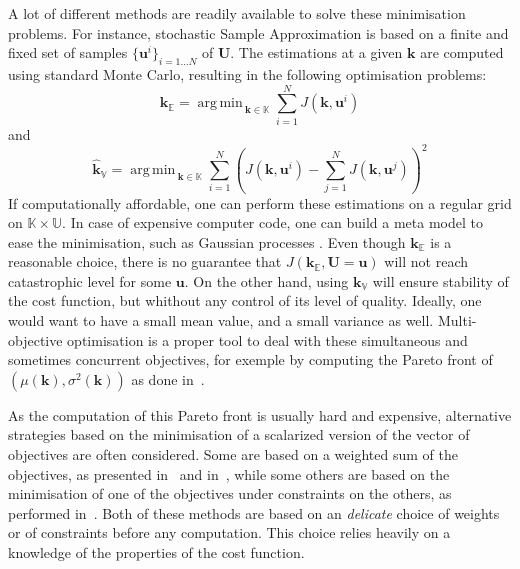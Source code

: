 \documentclass[preprint, 1p]{elsarticle}
\DeclareMathOperator*{\argmin}{arg\,min \,}
\newcommand{\Ex}{\mathbb{E}}
\newcommand{\Prob}{\mathbb{P}}
\newcommand{\kmean}{{\mathbf{k}}_{\Ex}}
\newcommand{\hatkmean}{\hat{\mathbf{k}}_{\Ex}}
\newcommand{\kvar}{{\mathbf{k}}_{\mathbb{V}}}
\newcommand{\hatkvar}{\hat{\mathbf{k}}_{\mathbb{V}}}
\newcommand{\Kspace}{\mathbb{K}}
\newcommand{\Uspace}{\mathbb{U}}
\begin{document}
A lot of different methods are readily available to solve these
minimisation problems. For instance, stochastic Sample Approximation
\citep{juditsky_stochastic_2009,kim_guide_2015} is based on a finite
and fixed set of samples $\{ \mathbf{u}^{i}\}_{i=1 \dots N}$ of
$\mathbf{U}$.
The estimations at a given $\mathbf{k}$ are computed using standard Monte Carlo, resulting in the following optimisation problems:
\begin{equation}
\hatkmean = \argmin_{\mathbf{k} \in \Kspace} \sum_{i=1}^N  J(\mathbf{k},\mathbf{u}^i)
\end{equation}
and
\begin{equation}
\hatkvar = \argmin_{\mathbf{k} \in \Kspace} \sum_{i=1}^N  \left( J(\mathbf{k},\mathbf{u}^i) -  \sum_{j=1}^N  J(\mathbf{k},\mathbf{u}^j) \right )^2
\end{equation}
If computationally affordable, one can perform these estimations on a regular grid on $\Kspace \times \Uspace$. In case of expensive computer code, one can build a meta model to ease the minimisation, such as Gaussian processes \citep{janusevskis_simultaneous_2010}.
Even though $\kmean$ is a reasonable choice, there is no guarantee that $J(\kmean, \mathbf{U}=\mathbf{u})$ will not reach catastrophic level for some  $\mathbf{u}$. On the other hand, using $\kvar$ will ensure stability of the cost function, but whithout any control of its level of quality.
%
%
Ideally, one would want to have a small mean value, and a small variance as well. Multi-objective optimisation is a proper tool to deal with these simultaneous and sometimes concurrent objectives, for exemple by computing the Pareto front of $\left(\mu(\mathbf{k}),\sigma^2(\mathbf{k})\right)$ as done in~\cite{baudoui_optimisation_2012}.

As the computation of this Pareto front is usually hard and expensive, alternative strategies based on the minimisation of a scalarized version of the vector of objectives are often considered. Some are based on a weighted sum of the objectives, as presented in~\cite{grodzevich_normalization_2006} and in~\cite{marler_weighted_2010}, while some others are based on the minimisation of one of the objectives under constraints on the others, as performed in~\cite{lehman_designing_2004}. Both of these methods are based on an \textit{delicate} choice of weights or of constraints before any computation. This choice relies heavily on a knowledge of the properties of the cost function.
\end{document}
